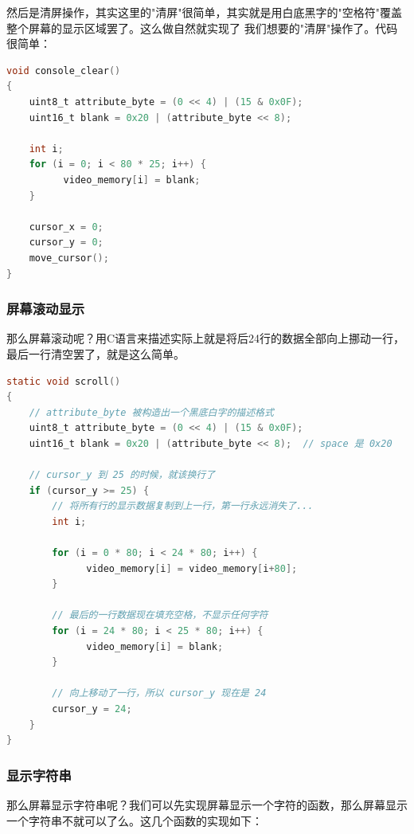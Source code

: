 \par 然后是清屏操作，其实这里的"清屏"很简单，其实就是用白底黑字的"空格符"覆盖整个屏幕的显示区域罢了。这么做自然就实现了\allowbreak
我们想要的"清屏"操作了。代码很简单：

\begin{lstlisting}[language = C, label = drivers/console.c, caption = drivers/console.c]
void console_clear()
{
	uint8_t attribute_byte = (0 << 4) | (15 & 0x0F);
	uint16_t blank = 0x20 | (attribute_byte << 8);

	int i;
	for (i = 0; i < 80 * 25; i++) {
	      video_memory[i] = blank;
	}

	cursor_x = 0;
	cursor_y = 0;
	move_cursor();
}
\end{lstlisting}

\subsubsection{屏幕滚动显示}

\par 那么屏幕滚动呢？用C语言来描述实际上就是将后24行的数据全部向上挪动一行，最后一行清空罢了，就是这么简单。

\begin{lstlisting}[language = C, label = drivers/console.c, caption = drivers/console.c]
static void scroll()
{
	// attribute_byte 被构造出一个黑底白字的描述格式
	uint8_t attribute_byte = (0 << 4) | (15 & 0x0F);
	uint16_t blank = 0x20 | (attribute_byte << 8);  // space 是 0x20

	// cursor_y 到 25 的时候，就该换行了
	if (cursor_y >= 25) {
		// 将所有行的显示数据复制到上一行，第一行永远消失了...
		int i;
		
		for (i = 0 * 80; i < 24 * 80; i++) {
		      video_memory[i] = video_memory[i+80];
		}

		// 最后的一行数据现在填充空格，不显示任何字符
		for (i = 24 * 80; i < 25 * 80; i++) {
		      video_memory[i] = blank;
		}
		
		// 向上移动了一行，所以 cursor_y 现在是 24
		cursor_y = 24;
	}
}
\end{lstlisting}

\subsubsection{显示字符串}

\par 那么屏幕显示字符串呢？我们可以先实现屏幕显示一个字符的函数，那么屏幕显示一个字符串不就可以了么。这几个函数的实现如下：

